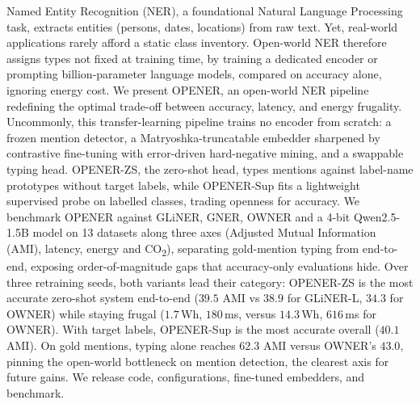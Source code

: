 Named Entity Recognition (NER), a foundational Natural Language Processing task, extracts entities (persons, dates, locations) from raw text. Yet, real-world applications rarely afford a static class inventory.
Open-world NER therefore assigns types not fixed at training time, by training a dedicated encoder or prompting billion-parameter language models, compared on accuracy alone, ignoring energy cost.
We present OPENER, an open-world NER pipeline redefining the optimal trade-off between accuracy, latency, and energy frugality.
Uncommonly, this transfer-learning pipeline trains no encoder from scratch: a frozen mention detector, a Matryoshka-truncatable embedder sharpened by contrastive fine-tuning with error-driven hard-negative mining, and a swappable typing head.
OPENER-ZS, the zero-shot head, types mentions against label-name prototypes without target labels, while OPENER-Sup fits a lightweight supervised probe on labelled classes, trading openness for accuracy.
We benchmark OPENER against GLiNER, GNER, OWNER and a 4-bit Qwen2.5-1.5B model on 13 datasets along three axes (Adjusted Mutual Information (AMI), latency, energy and CO\textsubscript{2}), separating gold-mention typing from end-to-end, exposing order-of-magnitude gaps that accuracy-only evaluations hide.
Over three retraining seeds, both variants lead their category: OPENER-ZS is the most accurate zero-shot system end-to-end ($39.5$ AMI vs $38.9$ for GLiNER-L, $34.3$ for OWNER) while staying frugal ($1.7$\,Wh, $180$\,ms, versus $14.3$\,Wh, $616$\,ms for OWNER).
With target labels, OPENER-Sup is the most accurate overall ($40.1$ AMI).
On gold mentions, typing alone reaches $62.3$ AMI versus OWNER's $43.0$, pinning the open-world bottleneck on mention detection, the clearest axis for future gains.
We release code, configurations, fine-tuned embedders, and benchmark.
